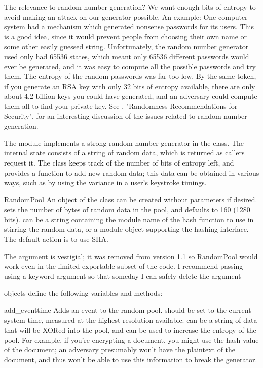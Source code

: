 \documentclass{howto}
\begin{document}
The relevance to random number generation?  We want enough bits of
entropy to avoid making an attack on our generator possible.  An
example: One computer system had a mechanism which generated nonsense
passwords for its users.  This is a good idea, since it would prevent
people from choosing their own name or some other easily guessed string.
Unfortunately, the random number generator used only had 65536 states,
which meant only 65536 different passwords would ever be generated, and
it was easy to compute all the possible passwords and try them.  The
entropy of the random passwords was far too low.  By the same token, if
you generate an RSA key with only 32 bits of entropy available, there
are only about 4.2 billion keys you could have generated, and an
adversary could compute them all to find your private key.  See ,
"Randomness Recommendations for Security", for an interesting discussion
of the issues related to random number generation.

The  module implements a strong random number generator
in the  class.  The internal state consists of a string
of random data, which is returned as callers request it.  The class
keeps track of the number of bits of entropy left, and provides a function to
add new random data; this data can be obtained in various ways, such as
by using the variance in a user's keystroke timings.  

\begin{classdesc}{RandomPool}{ }
An object of the  class can be created without
parameters if desired.   sets the number of bytes of
random data in the pool, and defaults to 160 (1280 bits). 
can be a string containing the module name of the hash function to use
in stirring the random data, or a module object supporting the hashing
interface.  The default action is to use SHA.

The  argument is vestigial; it was removed from version
1.1 so RandomPool would work even in the limited exportable subset of
the code.  I recommend passing  using a keyword argument so
that someday I can safely delete the  argument

\end{classdesc}

 objects define the following variables and methods:

\begin{methoddesc}{add_event}{time}
Adds an event to the random pool.   should be set to the
current system time, measured at the highest resolution available.
 can be a string of data that will be XORed into the pool,
and can be used to increase the entropy of the pool.  For example, if
you're encrypting a document, you might use the hash value of the
document; an adversary presumably won't have the plaintext of the
document, and thus won't be able to use this information to break the
generator.
\end{methoddesc}
\end{document}
